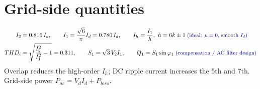 \documentclass[10pt,a4paper]{scrartcl}
\newcommand{\Vd}{V_{d}}
\newcommand{\Id}{I_{d}}
\newcommand{\Vll}{V_{2}}
\newcommand{\rt}[1]{\text{\small\color{blue!60!black} #1}}
\begin{document}
\section{Grid-side quantities}
\begin{align}
I_2 &= 0.816\,\Id, \qquad
I_1 = \frac{\sqrt6}{\pi}\Id = 0.780\,\Id, \qquad
I_h = \frac{I_1}{h},\ h = 6k\pm1 \;\rt{(ideal: $\mu=0$, smooth $\Id$)} \label{eq:I1}\\
THD_i &= \sqrt{\frac{I_2^2}{I_1^2}-1} = 0.311, \qquad
S_1 = \sqrt3\,\Vll I_1, \qquad
Q_1 = S_1\sin\varphi_1 \;\rt{(compensation / AC filter design)} \label{eq:THD}
\end{align}
Overlap reduces the high-order $I_h$; DC ripple current increases the 5th and 7th. Grid-side power $P_{ac} = \Vd\Id + P_{loss}$.

\end{document}

